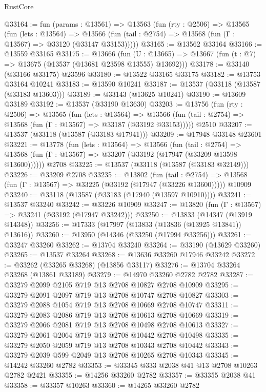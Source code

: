 \begin{lexlean}{RustCore}
\begin{coremodule}
@33164 := fun (params : @13561) =>
  @13563
    (fun (rty : @2506) =>
    @13565
      (fun (lets : @13564) =>
      @13566 (fun (tail : @2754) => @13568 (fun (Γ : @13567) => @33120 (@33147 @33153)))))
@33165 := @13562 @33164
@33166 := @13559 @33165
@33175 := @13666
    (fun (U : @13665) => @13667 (fun (t : @7) => @13675 (@13537 (@13681 @23598 @13555) @13692)))
@33178 := @33140 (@33166 @33175) @23596
@33180 := @13522 @33165 @33175
@33182 := @13753 @33164 @10241
@33183 := @13590 @10241
@33187 := @13537 (@33118 (@13587 (@33183 @13603)))
@33189 := @33143 (@13625 @10241)
@33190 := @13609 @33189
@33192 := @13537 (@33190 @13630)
@33203 := @13756
    (fun (rty : @2506) =>
    @13565
      (fun (lets : @13564) =>
      @13566 (fun (tail : @2754) => @13568 (fun (Γ : @13567) => @33187 (@33192 @33153)))))
    @2510
@33207 := @13537 (@33118 (@13587 (@33183 @17941)))
@33209 := @17948 @33148 @23601
@33221 := @13778
    (fun (lets : @13564) =>
    @13566
      (fun (tail : @2754) =>
      @13568 (fun (Γ : @13567) => @33207 (@33192 (@17947 (@33209 @13598 @13600))))))
    @2708
@33225 := @13537 (@33118 (@13587 (@33183 @32149)))
@33226 := @33209 @2708
@33235 := @13802
    (fun (tail : @2754) => @13568 (fun (Γ : @13567) => @33225 (@33192 (@17947 (@33226 @13600)))))
    @10909
@33240 := @33118 (@13587 (@33183 (@17940 (@13597 @10910))))
@33241 := @13537 @33240
@33242 := @33226 @10909
@33247 := @13820 (fun (Γ : @13567) => @33241 (@33192 (@17947 @33242)))
@33250 := @13833 (@14347 (@13919 @14348))
@33256 := @17333 (@17997 (@13833 (@13836 (@13925 @13841)) @13616))
@33260 := @13950 (@14346 (@33250 (@17994 @33256)))
@33261 := @33247 @33260
@33262 := @13704 @33240
@33264 := @33190 (@13629 @33260)
@33265 := @13537 @33264
@33268 := @13636 @33260 @17946 @33242
@33272 := @33262 (@33265 @33268) (@13856 @33117)
@33276 := @13704 @33264 @33268 (@13861 @33189)
@33279 := @14970 @33260 @2782 @2782
@33287 := @33279 @2099 @2105 @719 @13 @2708 @10827 @2708 @10909
@33295 := @33279 @2091 @2097 @719 @13 @2708 @10747 @2708 @10827
@33303 := @33279 @2088 @1054 @719 @13 @2708 @10669 @2708 @10747
@33311 := @33279 @2083 @2086 @719 @13 @2708 @10613 @2708 @10669
@33319 := @33279 @2066 @2081 @719 @13 @2708 @10498 @2708 @10613
@33327 := @33279 @2061 @2064 @719 @13 @2708 @10442 @2708 @10498
@33335 := @33279 @2050 @2059 @719 @13 @2708 @10343 @2708 @10442
@33343 := @33279 @2039 @599 @2049 @13 @2708 @10265 @2708 @10343
@33345 := @14242 @33260 @2782
@33353 := @33345 @333 @2038 @41 @13 @2708 @10263 @2782 @2421
@33355 := @14256 @33260 @2782
@33357 := @33355 @2038 @41
@33358 := @33357 @10263
@33360 := @14265 @33260 @2782

\end{coremodule}
\end{lexlean}
